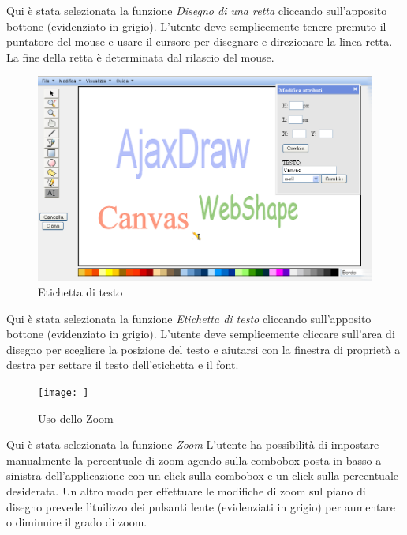 \vspace{300pt}
Qui \`e stata selezionata la funzione \textit{Disegno di una retta} cliccando sull'apposito bottone (evidenziato in grigio). L'utente deve semplicemente tenere premuto il puntatore del mouse e usare il cursore per disegnare e direzionare la linea retta. La fine della retta \`e determinata dal rilascio del mouse.

\begin{figure}[!ht]
\centering
\includegraphics[scale=4]{images/label.png}
\caption{Etichetta di testo}
\end{figure} 

\vspace{300pt}
Qui \`e stata selezionata la funzione \textit{Etichetta di testo} cliccando sull'apposito bottone (evidenziato in grigio). L'utente deve semplicemente cliccare sull'area di disegno per scegliere la posizione del testo e aiutarsi con la finestra di propriet\`a a destra per settare il testo dell'etichetta e il font.
 
\begin{figure}[!ht]
\centering
\texttt{[image: ]}
\caption{Uso dello Zoom}
\end{figure} 

\vspace{100pt}
Qui \`e stata selezionata la funzione \textit{Zoom} L'utente ha possibilit\`a di impostare manualmente la percentuale di zoom agendo sulla combobox posta in basso a sinistra dell'applicazione con un click sulla combobox e un click sulla percentuale desiderata. Un altro modo per effettuare le modifiche di zoom sul piano di disegno prevede l'tuilizzo dei pulsanti lente (evidenziati in grigio) per aumentare o diminuire il grado di zoom.
 
